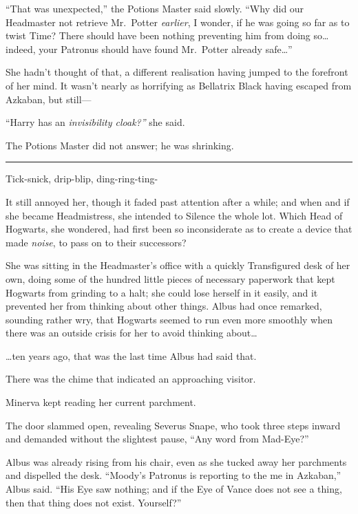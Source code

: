 ``That was unexpected,'' the Potions Master said slowly. ``Why did our
Headmaster not retrieve Mr.~Potter \emph{earlier}, I wonder, if he was
going so far as to twist Time? There should have been nothing preventing
him from doing so\ldots{} indeed, your Patronus should have found
Mr.~Potter already safe\ldots{}''

She hadn't thought of that, a different realisation having jumped to the
forefront of her mind. It wasn't nearly as horrifying as Bellatrix Black
having escaped from Azkaban, but still---

``Harry has an \emph{invisibility cloak?''} she said.

The Potions Master did not answer; he was shrinking.

\begin{center}\rule{3in}{0.4pt}\end{center}

Tick-snick, drip-blip, ding-ring-ting-

It still annoyed her, though it faded past attention after a while; and
when and if she became Headmistress, she intended to Silence the whole
lot. Which Head of Hogwarts, she wondered, had first been so
inconsiderate as to create a device that made \emph{noise}, to pass on
to their successors?

She was sitting in the Headmaster's office with a quickly Transfigured
desk of her own, doing some of the hundred little pieces of necessary
paperwork that kept Hogwarts from grinding to a halt; she could lose
herself in it easily, and it prevented her from thinking about other
things. Albus had once remarked, sounding rather wry, that Hogwarts
seemed to run even more smoothly when there was an outside crisis for
her to avoid thinking about\ldots{}

\ldots{}ten years ago, that was the last time Albus had said that.

There was the chime that indicated an approaching visitor.

Minerva kept reading her current parchment.

The door slammed open, revealing Severus Snape, who took three steps
inward and demanded without the slightest pause, ``Any word from
Mad-Eye?''

Albus was already rising from his chair, even as she tucked away her
parchments and dispelled the desk. ``Moody's Patronus is reporting to
the me in Azkaban,'' Albus said. ``His Eye saw nothing; and if the Eye
of Vance does not see a thing, then that thing does not exist.
Yourself?''

